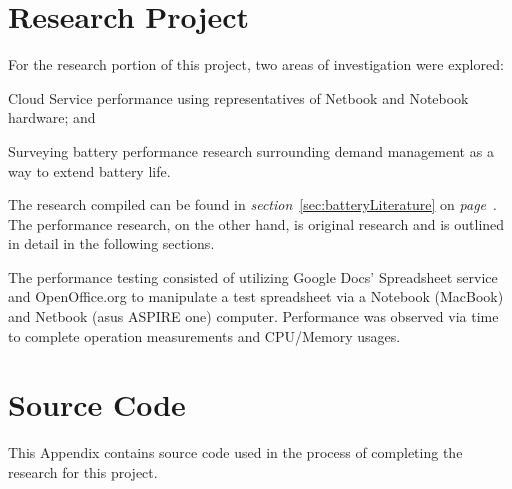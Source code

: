 \documentclass[12pt,oneside,letterpaper,titlepage]{report}
\begin{document}
  

\chapter{Research Project}

For the research portion of this project, two areas of investigation were explored:
\begin{inparaenum}[(1)]
\item Cloud Service performance using representatives of Netbook and Notebook
  hardware; and
\item Surveying battery performance research surrounding demand management as
  a way to extend battery life.
\end{inparaenum}
The research compiled can be found in \emph{section}~\ref{sec:batteryLiterature} on
\emph{page}~\pageref{sec:batteryLiterature}.  The performance research, on the other
hand, is original research and is outlined in detail in the following sections.

The performance testing consisted of utilizing Google Docs' Spreadsheet service
and OpenOffice.org to manipulate a test spreadsheet via a Notebook (MacBook) and
Netbook (asus ASPIRE one) computer.  Performance was observed via time to
complete operation measurements and CPU/Memory usages.

  

  

  

  

\appendix

\chapter{Source Code}

This Appendix contains source code used in the process of completing the
research for this project.

\newpage

\label{sourceCode}



\newpage


\end{document}
